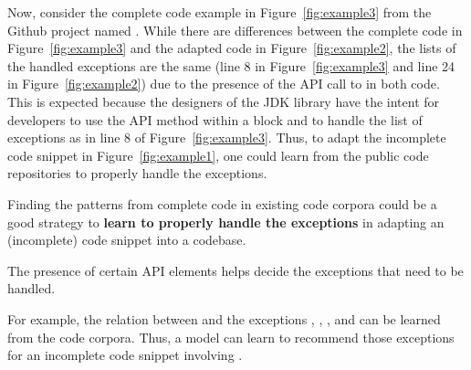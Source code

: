 






Now, consider the complete code example in Figure~\ref{fig:example3}
from the Github project named . While there are
differences between the complete code in Figure~\ref{fig:example3} and
the adapted code in Figure~\ref{fig:example2}, the lists of the handled
exceptions are the same (line 8 in Figure~\ref{fig:example3} and line
24 in Figure~\ref{fig:example2}) due to the presence of the API call
to  in both code. This is expected because
the designers of the JDK library have the intent for developers to use
the API method  within a 
block and to handle the list of exceptions as in line 8 of
Figure~\ref{fig:example3}. Thus, to adapt the incomplete code snippet
in Figure~\ref{fig:example1}, one could learn from the public code
repositories to properly handle the exceptions.

\begin{Observation} 
\label{ob2}
Finding the patterns from complete code in existing code corpora could
be a good strategy to {\bf learn to properly handle the exceptions} in
adapting an (incomplete) code snippet into a codebase.
\end{Observation}

\begin{Observation} 
\label{ob3}
The presence of certain API elements helps decide the exceptions that
need to be handled.
\end{Observation}


For example, the relation between
 and the exceptions
, ,
, and
 can be learned from the
code corpora. Thus, a model can learn to recommend those exceptions
for an incomplete code snippet involving .


